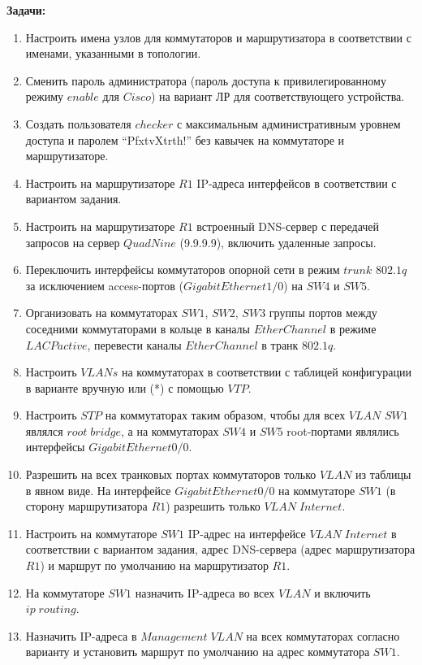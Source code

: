 {\bfseries Задачи:}
\begin{enumerate}
    \item Настроить имена узлов для коммутаторов и маршрутизатора в соответствии с именами, указанными в топологии.
    \item Сменить пароль администратора (пароль доступа к привилегированному режиму $enable$ для $Cisco$) на вариант ЛР для соответствующего устройства.
    \item Создать пользователя $checker$ с максимальным административным уровнем доступа и паролем “PfxtvXtrth!” без кавычек на коммутаторе и маршрутизаторе.
    \item Настроить на маршрутизаторе $R1$ IP-адреса интерфейсов в соответствии с вариантом задания.
    \item Настроить на маршрутизаторе $R1$ встроенный DNS-сервер с передачей запросов на сервер $QuadNine$ (9.9.9.9), включить удаленные запросы.
    \item Переключить интерфейсы коммутаторов опорной сети в режим $trunk$ $802.1q$ за исключением access-портов ($GigabitEthernet1/0$) на $SW4$ и $SW5$.
    \item Организовать на коммутаторах $SW1$, $SW2$, $SW3$ группы портов между соседними коммутаторами в кольце в каналы $EtherChannel$ в режиме $LACP active$, перевести каналы $EtherChannel$ в транк $802.1q$.
    \item Настроить $VLANs$ на коммутаторах в соответствии с таблицей конфигурации в варианте вручную или (*) с помощью $VTP$.
    \item Настроить $STP$ на коммутаторах таким образом, чтобы для всех $VLAN$ $SW1$ являлся $root\;bridge$, а на коммутаторах $SW4$ и $SW5$ root-портами являлись интерфейсы $GigabitEthernet0/0$.
    \item Разрешить на всех транковых портах коммутаторов только $VLAN$ из таблицы в явном виде. На интерфейсе $GigabitEthernet0/0$ на коммутаторе $SW1$ (в сторону маршрутизатора $R1$) разрешить только $VLAN\;Internet$.
    \item Настроить на коммутаторе $SW1$ IP-адрес на интерфейсе $VLAN\;Internet$ в соответствии с вариантом задания, адрес DNS-сервера (адрес маршрутизатора $R1$) и маршрут по умолчанию на маршрутизатор $R1$.
    \item На коммутаторе $SW1$ назначить IP-адреса во всех $VLAN$ и включить $ip\;routing$.
    \item Назначить IP-адреса в $Management\;VLAN$ на всех коммутаторах согласно варианту и установить маршрут по умолчанию на адрес коммутатора $SW1$.

\end{enumerate}
